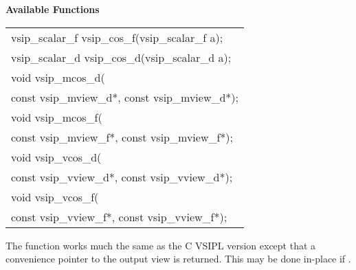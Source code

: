 \cvsiplh
\newline \hspace*{.8cm} \vspace*{.1cm} \textbf{Available Functions }
\newline \hspace*{1.1cm} {
\ttfamily
\begin{tabular}[H]{l}
vsip\_scalar\_f vsip\_cos\_f(vsip\_scalar\_f a);\\
vsip\_scalar\_d vsip\_cos\_d(vsip\_scalar\_d a);\\
void vsip\_mcos\_d(\\*
\hspace{1cm}const vsip\_mview\_d*, const vsip\_mview\_d*);\\
void vsip\_mcos\_f(\\*
\hspace{1cm}const vsip\_mview\_f*, const vsip\_mview\_f*);\\
void vsip\_vcos\_d(\\*
\hspace{1cm}const vsip\_vview\_d*, const vsip\_vview\_d*);\\
void vsip\_vcos\_f(\\*
\hspace{1cm}const vsip\_vview\_f*, const vsip\_vview\_f*);\\
\end{tabular}
}
\pyjvsiph
{}
\newline\hspace*{1.2cm}\parbox{10.8cm}{\vspace*{.1cm}The  function works much the same as the C VSIPL version except that a convenience pointer to the output view is returned. This may be done in-place if .}
